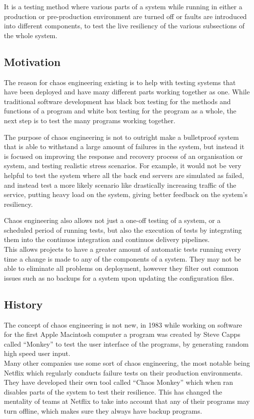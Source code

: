 \documentclass[conference]{IEEEtran}
\begin{document}
It is a testing method where various parts of a system while running in either a production or pre-production environment are turned off or faults are introduced into different components, to test the live resiliency of the various subsections of the whole system.

\subsection{Motivation}

The reason for chaos engineering existing is to help with testing systems that have been deployed and have many different parts working together as one. While traditional software development has black box testing for the methods and functions of a program and white box testing for the program as a whole, the next step is to test the many programs working together.

The purpose of chaos engineering is not to outright make a bulletproof system that is able to withstand a large amount of failures in the system, but instead it is focused on improving the response and recovery process of an organisation or system, and testing realistic stress scenarios. For example, it would not be very helpful to test the system where all the back end servers are simulated as failed, and instead test a more likely scenario like drastically increasing traffic of the service, putting heavy load on the system, giving better feedback on the system's resiliency.

Chaos engineering also allows not just a one-off testing of a system, or a scheduled period of running tests, but also the execution of tests by integrating them into the continuos integration and continuos delivery pipelines. \cite{b2} \\
This allows projects to have a greater amount of automatic tests running every time a change is made to any of the components of a system. They may not be able to eliminate all problems on deployment, however they filter out common issues such as no backups for a system upon updating the configuration files.

\subsection{History}

The concept of chaos engineering is not new, in 1983 while working on software for the first Apple Macintosh computer a program was created by Steve Capps called ``Monkey'' to test the user interface of the programs, by generating random high speed user input.\\
Many other companies use some sort of chaos engineering, the most notable being Netflix which regularly conducts failure tests on their production environments. They have developed their own tool called ``Chaos Monkey'' which when ran disables parts of the system to test their resilience. This has changed the mentality of teams at Netflix to take into account that any of their programs may turn offline, which makes sure they always have backup programs. \cite{b3}
\end{document}
